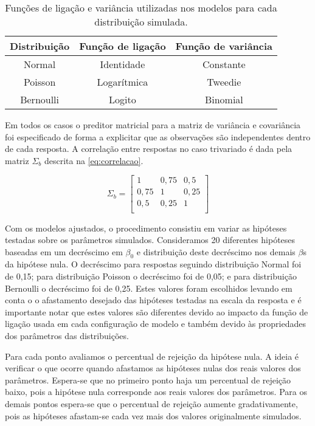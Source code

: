 \begin{table}[H]
\centering
\begin{tabular}{ccc}
\hline
Distribuição & Função de ligação & Função de variância \\ \hline
Normal       & Identidade        & Constante           \\
Poisson      & Logarítmica       & Tweedie             \\
Bernoulli    & Logito            & Binomial            \\ \hline
\end{tabular}
\caption{Funções de ligação e variância utilizadas nos modelos para cada distribuição simulada.}
\label{tab:link_var}
\end{table}

Em todos os casos o preditor matricial para a matriz de variância e covariância foi especificado de forma a explicitar que as observações são independentes dentro de cada resposta. A correlação entre respostas no caso trivariado é dada pela matriz $\Sigma_b$ descrita na \autoref{eq:correlacao}.

\begin{equation} \label{eq:correlacao}
\Sigma_b = 
\begin{bmatrix}
1    & 0,75 & 0,5  \\
0,75 & 1    & 0,25 \\
0,5  & 0,25 & 1    \\
\end{bmatrix}
\end{equation}

Com os modelos ajustados, o procedimento consistiu em variar as hipóteses testadas sobre os parâmetros simulados. Consideramos 20 diferentes hipóteses baseadas em um decréscimo em $\beta_0$ e distribuição deste decréscimo nos demais $\beta$s da hipótese nula. O decréscimo para respostas seguindo distribuição Normal foi de 0,15; para distribuição Poisson o decréscimo foi de 0,05; e para distribuição Bernoulli o decréscimo foi de 0,25. Estes valores foram escolhidos levando em conta o o afastamento desejado das hipóteses testadas na escala da resposta e é importante notar que estes valores são diferentes devido ao impacto da função de ligação usada em cada configuração de modelo e também devido às propriedades dos parâmetros das distribuições.

Para cada ponto avaliamos o percentual de rejeição da hipótese nula. A ideia é verificar o que ocorre quando afastamos as hipóteses nulas dos reais valores dos parâmetros. Espera-se que no primeiro ponto haja um percentual de rejeição baixo, pois a hipótese nula corresponde aos reais valores dos parâmetros. Para os demais pontos espera-se que o percentual de rejeição aumente gradativamente, pois as hipóteses afastam-se cada vez mais dos valores originalmente simulados. 


